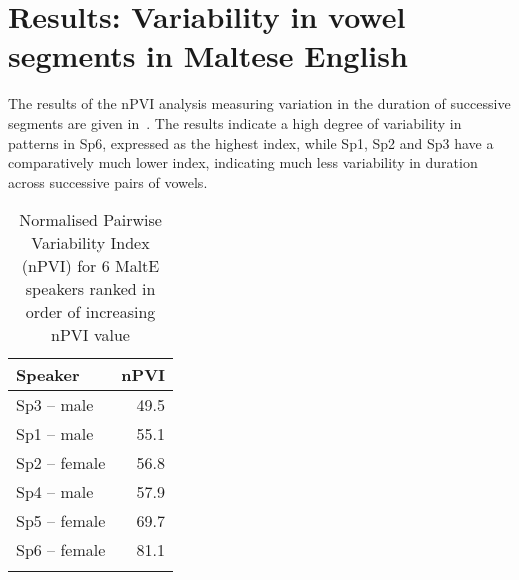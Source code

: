 \documentclass[output=paper]{langsci/langscibook}
\begin{document}
\section{Results: Variability in vowel segments in Maltese English}
\label{sec:key:grech4}
The results of the nPVI analysis measuring variation in the duration
of successive  segments are given in~. The
results indicate a high degree of variability in 
patterns in Sp6, expressed as the highest index, while Sp1, Sp2 and
Sp3 have a comparatively much lower index, indicating much less
variability in duration across successive pairs of vowels.


\begin{table}
\caption{\label{tab:key:grech2}Normalised Pairwise Variability Index (nPVI) for 6 MaltE speakers ranked in order of increasing nPVI value}
\begin{tabularx}{.6\textwidth}{Xr}
\lsptoprule
 \textbf{Speaker} & \textbf{nPVI} \\
 \midrule 
 Sp3 – male & 49.5\\
 Sp1 – male & 55.1\\
 Sp2 – female & 56.8\\
 Sp4 – male & 57.9\\
 Sp5 – female & 69.7\\
 Sp6 – female & 81.1\\
\lspbottomrule
\end{tabularx}
\end{table} 
\end{document}

